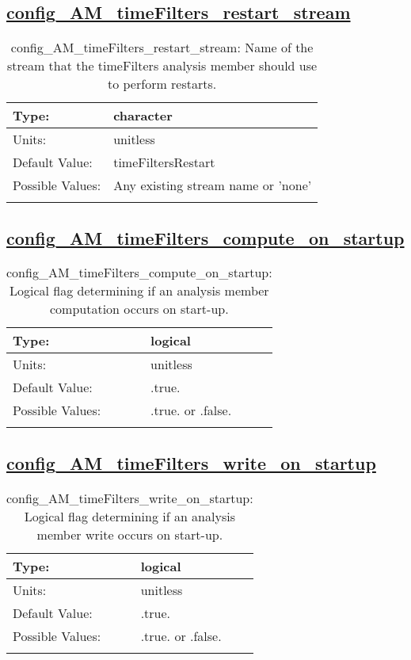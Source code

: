 \subsection[config\_AM\_timeFilters\_restart\_stream]{\hyperref[sec:nm_tab_AM_timeFilters]{config\_AM\_timeFilters\_restart\_stream}}
\label{subsec:nm_sec_config_AM_timeFilters_restart_stream}
\begin{center}
\begin{longtable}{| p{2.0in} || p{4.0in} |}
    \hline
    Type: & character \\
    \hline
    Units: & \si{unitless} \\
    \hline
    Default Value: & timeFiltersRestart \\
    \hline
    Possible Values: & Any existing stream name or 'none' \\
    \hline
    \caption{config\_AM\_timeFilters\_restart\_stream: Name of the stream that the timeFilters analysis member should use to perform restarts.}
\end{longtable}
\end{center}
\subsection[config\_AM\_timeFilters\_compute\_on\_startup]{\hyperref[sec:nm_tab_AM_timeFilters]{config\_AM\_timeFilters\_compute\_on\_startup}}
\label{subsec:nm_sec_config_AM_timeFilters_compute_on_startup}
\begin{center}
\begin{longtable}{| p{2.0in} || p{4.0in} |}
    \hline
    Type: & logical \\
    \hline
    Units: & \si{unitless} \\
    \hline
    Default Value: & .true. \\
    \hline
    Possible Values: & .true. or .false. \\
    \hline
    \caption{config\_AM\_timeFilters\_compute\_on\_startup: Logical flag determining if an analysis member computation occurs on start-up.}
\end{longtable}
\end{center}
\subsection[config\_AM\_timeFilters\_write\_on\_startup]{\hyperref[sec:nm_tab_AM_timeFilters]{config\_AM\_timeFilters\_write\_on\_startup}}
\label{subsec:nm_sec_config_AM_timeFilters_write_on_startup}
\begin{center}
\begin{longtable}{| p{2.0in} || p{4.0in} |}
    \hline
    Type: & logical \\
    \hline
    Units: & \si{unitless} \\
    \hline
    Default Value: & .true. \\
    \hline
    Possible Values: & .true. or .false. \\
    \hline
    \caption{config\_AM\_timeFilters\_write\_on\_startup: Logical flag determining if an analysis member write occurs on start-up.}
\end{longtable}
\end{center}
